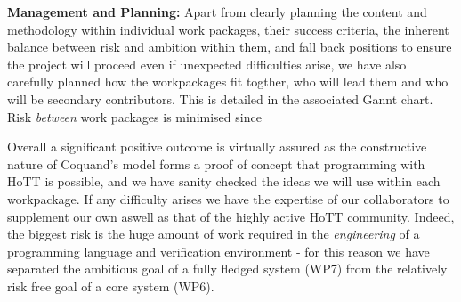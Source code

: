 \documentclass[a4paper,11pt]{article}
\begin{document}
{\bf Management and Planning:} Apart from clearly planning the content
and methodology within individual work packages, their success
criteria, the inherent balance between risk and ambition within them,
and fall back positions to ensure the project will proceed even if
unexpected difficulties arise, we have also carefully planned how the
workpackages fit togther, who will lead them and who will be secondary
contributors. This is detailed in the associated Gannt chart.
Risk {\em between} work packages is minimised since

Overall a significant positive outcome is virtually assured as the
constructive nature of Coquand's model forms a proof of concept that
programming with HoTT is possible, and we have sanity checked the
ideas we will use within each workpackage. If any difficulty arises we
have the expertise of our collaborators to supplement our own aswell
as that of the highly active HoTT community. Indeed, the biggest risk
is the huge amount of work required in the {\em engineering} of a
programming language and verification environment - for this reason we
have separated the ambitious goal of a fully fledged system (WP7) from
the relatively risk free goal of a core system (WP6).
\end{document}
